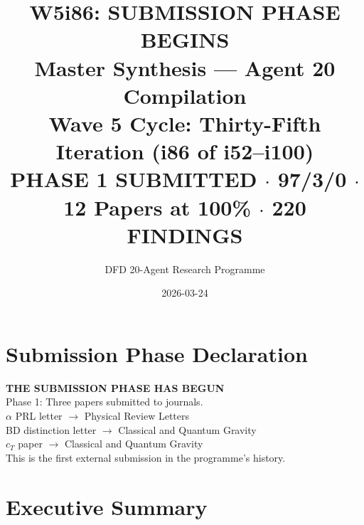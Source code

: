 \documentclass[11pt,a4paper]{article}
\title{\Huge W5i86: SUBMISSION PHASE BEGINS\\[12pt]
\Large Master Synthesis --- Agent 20 Compilation\\[6pt]
\large Wave 5 Cycle: Thirty-Fifth Iteration (i86 of i52--i100)\\[6pt]
\normalsize \textbf{PHASE 1 SUBMITTED} $\cdot$ 97/3/0 $\cdot$ 12 Papers at 100\% $\cdot$ 220 FINDINGS}
\author{DFD 20-Agent Research Programme}
\date{2026-03-24}
\begin{document}
\maketitle

\section*{Submission Phase Declaration}

\begin{tcolorbox}[colback=green!5!white, colframe=dfdgreen]
\begin{center}
\Large\textbf{THE SUBMISSION PHASE HAS BEGUN}\\[6pt]
\large Phase 1: Three papers submitted to journals.\\
$\alpha$ PRL letter $\to$ Physical Review Letters\\
BD distinction letter $\to$ Classical and Quantum Gravity\\
$c_T$ paper $\to$ Classical and Quantum Gravity\\[6pt]
\normalsize This is the first external submission in the programme's history.
\end{center}
\end{tcolorbox}

\section{Executive Summary}
\end{document}
